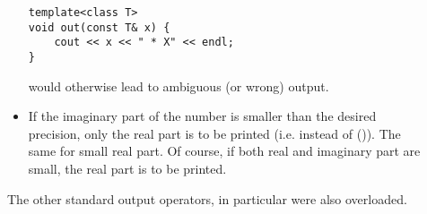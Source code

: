 \begin{description}
\begin{itemize}
\begin{lstlisting}
template<class T>
void out(const T& x) {
	cout << x << " * X" << endl;
}
\end{lstlisting}
would otherwise lead to ambiguous (or wrong) output.
\item If the imaginary part of the number is smaller than the desired precision, only the real part is to be printed (i.e.  instead of ()). The same for small real part. Of course, if both real and imaginary part are small, the real part is to be printed.
\end{itemize}
The other standard output operators, in particular  were also overloaded.
\end{description}